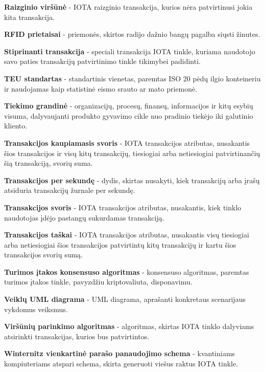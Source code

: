 \noindent \textbf{Raizginio viršūnė} - IOTA raizginio transakcija, kurios nėra patvirtinusi jokia kita transakcija.

\noindent \textbf{RFID prietaisai} - priemonės, skirtos radijo dažnio bangų pagalba siųsti žinutes.

\noindent \textbf{Stiprinanti transakcija} - speciali transakcija IOTA tinkle, kuriama naudotojo savo paties transakcijų patvirtinimo tinkle tikimybei padidinti.

\noindent \textbf{TEU standartas} - standartinis vienetas, paremtas ISO 20 pėdų ilgio konteineriu ir naudojamas kaip statistinė eismo srauto ar mato priemonė.

\noindent \textbf{Tiekimo grandinė} - organizacijų, procesų, finansų, informacijos ir kitų esybių visuma, dalyvaujanti produkto gyvavimo cikle nuo pradinio tiekėjo iki galutinio kliento.

\noindent \textbf{Transakcijos kaupiamasis svoris} - IOTA transakcijos atributas, nusakantis šios transakcijos ir visų kitų transakcijų, tiesiogiai arba netiesiogiai patvirtinančių šią transakciją, svorių suma.

\noindent \textbf{Transakcijos per sekundę} - dydis, skirtas nusakyti, kiek transakcijų arba įrašų atsiduria transakcijų žurnale per sekundę.

\noindent \textbf{Transakcijos svoris} - IOTA transakcijos atributas, nusakantis, kiek tinklo naudotojas įdėjo pastangų sukurdamas transakciją.

\noindent \textbf{Transakcijos taškai} - IOTA transakcijos atributas, nusakantis visų tiesiogiai arba netiesiogiai šios transakcijos patvirtintų kitų transakcijų ir kartu šios transakcijos svorių sumą.

\noindent \textbf{Turimos įtakos konsensuso algoritmas} - konsensuso algoritmas, paremtas turimos įtakos tinkle, pavyzdžiu kriptovaliuta, disponavimu.

\noindent \textbf{Veiklų UML diagrama} - UML diagrama, aprašanti konkretaus scenarijaus vykdomus veiksmus.

\noindent \textbf{Viršūnių parinkimo algoritmas} - algoritmas, skirtas IOTA tinklo dalyviams atsirinkti transakcijas, kurios bus patvirtintos.

\noindent \textbf{Winternitz vienkartinė parašo panaudojimo schema} - kvantiniams kompiuteriams atspari schema, skirta generuoti viešus raktus IOTA tinkle.